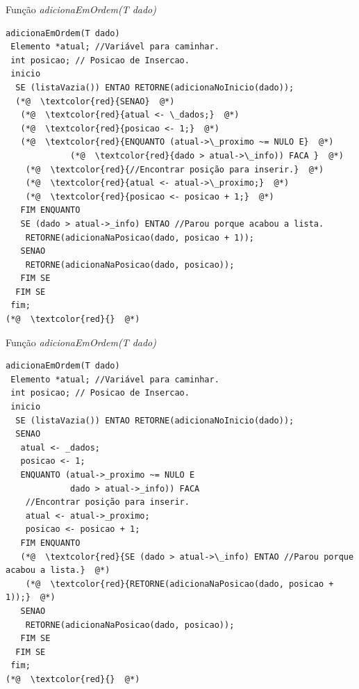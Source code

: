 \documentclass[12pt,table,xcolor={dvipsnames}]{beamer}
\begin{document}
\begin{frame}[fragile]{Função \textit{adicionaEmOrdem(T dado)}}
\begin{lstlisting}
adicionaEmOrdem(T dado)
 Elemento *atual; //Variável para caminhar.
 int posicao; // Posicao de Insercao.
 inicio
  SE (listaVazia()) ENTAO RETORNE(adicionaNoInicio(dado));
  (*@  \textcolor{red}{SENAO}  @*)
   (*@  \textcolor{red}{atual <- \_dados;}  @*)
   (*@  \textcolor{red}{posicao <- 1;}  @*)
   (*@  \textcolor{red}{ENQUANTO (atual->\_proximo ~= NULO E}  @*)
             (*@  \textcolor{red}{dado > atual->\_info)) FACA }  @*)
    (*@  \textcolor{red}{//Encontrar posição para inserir.}  @*)
    (*@  \textcolor{red}{atual <- atual->\_proximo;}  @*)
    (*@  \textcolor{red}{posicao <- posicao + 1;}  @*)
   FIM ENQUANTO
   SE (dado > atual->_info) ENTAO //Parou porque acabou a lista.
    RETORNE(adicionaNaPosicao(dado, posicao + 1));
   SENAO
    RETORNE(adicionaNaPosicao(dado, posicao));
   FIM SE
  FIM SE
 fim;
(*@  \textcolor{red}{}  @*)
\end{lstlisting}
\end{frame}

\begin{frame}[fragile]{Função \textit{adicionaEmOrdem(T dado)}}
\begin{lstlisting}
adicionaEmOrdem(T dado)
 Elemento *atual; //Variável para caminhar.
 int posicao; // Posicao de Insercao.
 inicio
  SE (listaVazia()) ENTAO RETORNE(adicionaNoInicio(dado));
  SENAO
   atual <- _dados;
   posicao <- 1;
   ENQUANTO (atual->_proximo ~= NULO E
             dado > atual->_info)) FACA 
    //Encontrar posição para inserir.
    atual <- atual->_proximo;
    posicao <- posicao + 1;
   FIM ENQUANTO
   (*@  \textcolor{red}{SE (dado > atual->\_info) ENTAO //Parou porque acabou a lista.}  @*)
    (*@  \textcolor{red}{RETORNE(adicionaNaPosicao(dado, posicao + 1));}  @*)
   SENAO
    RETORNE(adicionaNaPosicao(dado, posicao));
   FIM SE
  FIM SE
 fim;
(*@  \textcolor{red}{}  @*)
\end{lstlisting}
\end{frame}
\end{document}
